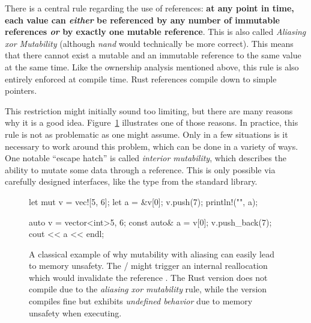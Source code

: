 {{There is a central rule regarding the use of references: \textbf{at any point in time, each value can \emph{either} be referenced by any number of immutable references \emph{or} by exactly one mutable reference}.
This is also called \emph{Aliasing xor Mutability} (although \emph{nand} would technically be more correct).
This means that there cannot exist a mutable and an immutable reference to the same value at the same time.
Like the ownership analysis mentioned above, this rule is also entirely enforced at compile time.
Rust references compile down to simple pointers.

This restriction might initially sound too limiting, but there are many reasons why it is a good idea.
Figure~\ref{fig:vector-bad} illustrates one of those reasons.
In practice, this rule is not as problematic as one might assume.
Only in a few situations is it necessary to work around this problem, which can be done in a variety of ways.
One notable \enquote{escape hatch} is called \emph{interior mutability}, which describes the ability to mutate some data through a  reference.
This is only possible via carefully designed interfaces, like the type  from the standard library.

\begin{figure}[t]
  \centering
    \begin{minipage}[t]{.49\textwidth}
    \begin{rustcode}
      let mut v = vec![5, 6];
      let a = &v[0];
      v.push(7);
      println!("{}", a);
    \end{rustcode}
  \end{minipage}
  \begin{minipage}[t]{.49\textwidth}
    \begin{cppcode}
      auto v = vector<int>{5, 6};
      const auto& a = v[0];
      v.push_back(7);
      cout << a << endl;
    \end{cppcode}
  \end{minipage}
  \caption{
    A classical example of why mutability with aliasing can easily lead to memory unsafety.
    The / might trigger an internal reallocation which would invalidate the reference .
    The Rust version does not compile due to the \emph{aliasing xor mutability} rule, while the \cpp version compiles fine but exhibits \emph{undefined behavior} due to memory unsafety when executing.
  }
  \label{fig:vector-bad}
\end{figure}

}}
